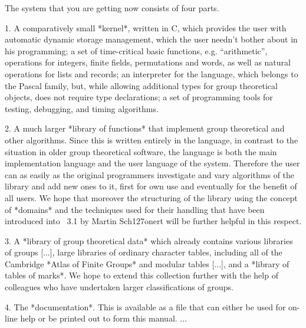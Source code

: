 The system that you are getting now consists of four parts.
\beginlist
  \item{1.}
    A comparatively small *kernel*, written in C, which provides the user
    with
    \itemitem{-}
      automatic dynamic storage management, which the user needn't bother
      about in his programming;
    \itemitem{-}
      a   set of  time-critical basic   functions, e.g.   ``arithmetic'',
      operations for integers, finite fields,  permutations and words, as
      well as natural operations for lists and records;
    \itemitem{-}
      an interpreter for the {\GAP} language, which belongs to the Pascal
      family, but, while  allowing additional types for group theoretical
      objects, does not require type declarations;
    \itemitem{-}
      a   set  of programming tools  for   testing, debugging, and timing
      algorithms.

  \item{2.}
    A   much larger *library of    {\GAP} functions* that implement group
    theoretical and other algorithms.  Since  this is written entirely in
    the  {\GAP} language, in contrast  to  the situation  in older  group
    theoretical   software, the  {\GAP}    language   is both   the  main
    implementation language   and  the  user  language of   the   system.
    Therefore  the  user can    as easily  as  the  original  programmers
    investigate  and vary algorithms of  the library and  add new ones to
    it, first for own  use and eventually for  the benefit of  all {\GAP}
    users.  We hope  that moreover the  structuring of the  library using
    the concept of  *domains* and the techniques  used for their handling
    that have   been   introduced     into   {\GAP}~3.1    by      Martin
    Sch\accent127onert will be further helpful in this respect.

  \item{3.}
    A *library of group  theoretical data* which already contains various
    libraries of groups [$\ldots$], large libraries of ordinary character
    tables, including all of the Cambridge *Atlas of Finite Groups* and
    modular tables [$\ldots$], and a *library of tables of marks*.
    We hope to extend this collection further with the help of colleagues
    who have undertaken larger classifications of groups.

  \item{4.}
    The *documentation*.  This is available as  a file that can either be
    used for on-line  help or be printed  out to form  this manual.
    $\ldots$
\endlist

